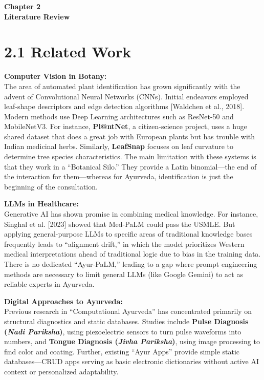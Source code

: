 \documentclass[12pt]{article}
\begin{document}
\vspace*{\fill}
\begin{center}
\textbf{\Huge{Chapter 2}}\\
\vspace{5mm}
\textbf{\Huge{Literature Review}}
\end{center}
\vspace*{\fill}
\newpage

\section*{2.1 \quad Related Work}
\justify

\noindent\textbf{Computer Vision in Botany:}\\
The area of automated plant identification has grown significantly with the advent of Convolutional
Neural Networks (CNNs). Initial endeavors employed leaf-shape descriptors and edge detection
algorithms [Waldchen et al., 2018]. Modern methods use Deep Learning architectures such as
ResNet-50 and MobileNetV3. For instance, \textbf{Pl@ntNet}, a citizen-science project, uses a huge
shared dataset that does a great job with European plants but has trouble with Indian medicinal
herbs. Similarly, \textbf{LeafSnap} focuses on leaf curvature to determine tree species
characteristics. The main limitation with these systems is that they work in a ``Botanical Silo.''
They provide a Latin binomial---the end of the interaction for them---whereas for Ayurveda,
identification is just the beginning of the consultation.

\vspace{5mm}

\noindent\textbf{LLMs in Healthcare:}\\
Generative AI has shown promise in combining medical knowledge. For instance, Singhal et al.
[2023] showed that Med-PaLM could pass the USMLE. But applying general-purpose LLMs to specific
areas of traditional knowledge bases frequently leads to ``alignment drift,'' in which the model
prioritizes Western medical interpretations ahead of traditional logic due to bias in the training
data. There is no dedicated ``Ayur-PaLM,'' leading to a gap where prompt engineering methods are
necessary to limit general LLMs (like Google Gemini) to act as reliable experts in Ayurveda.

\vspace{5mm}

\noindent\textbf{Digital Approaches to Ayurveda:}\\
Previous research in ``Computational Ayurveda'' has concentrated primarily on structural diagnostics
and static databases. Studies include \textbf{Pulse Diagnosis (\textit{Nadi Pariksha})}, using
piezoelectric sensors to turn pulse waveforms into numbers, and \textbf{Tongue Diagnosis
(\textit{Jivha Pariksha})}, using image processing to find color and coating. Further, existing
``Ayur Apps'' provide simple static databases---CRUD apps serving as basic electronic dictionaries
without active AI context or personalized adaptability.
\end{document}
